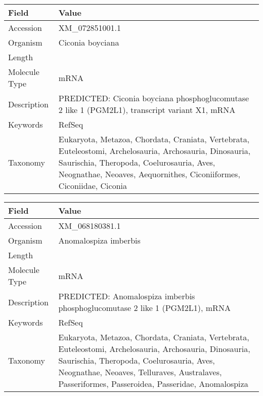 \documentclass[10pt]{article}
\begin{document}
\vspace{1em}
{\footnotesize
\begin{longtable}{>{\raggedright\arraybackslash}p{4.5cm} >{\raggedright\arraybackslash}p{11.5cm}}
\textbf{Field} & \textbf{Value} \\
\hline
Accession & XM\_072851001.1 \\
Organism & Ciconia boyciana \\
Length & 6462 \\
Molecule Type & mRNA \\
Description & PREDICTED: Ciconia boyciana phosphoglucomutase 2 like 1 (PGM2L1), transcript variant X1, mRNA \\
Keywords & RefSeq \\
Taxonomy & Eukaryota, Metazoa, Chordata, Craniata, Vertebrata, Euteleostomi, Archelosauria, Archosauria, Dinosauria, Saurischia, Theropoda, Coelurosauria, Aves, Neognathae, Neoaves, Aequornithes, Ciconiiformes, Ciconiidae, Ciconia \\
\end{longtable}
}

\vspace{1em}
{\footnotesize
\begin{longtable}{>{\raggedright\arraybackslash}p{4.5cm} >{\raggedright\arraybackslash}p{11.5cm}}
\textbf{Field} & \textbf{Value} \\
\hline
Accession & XM\_068180381.1 \\
Organism & Anomalospiza imberbis \\
Length & 5509 \\
Molecule Type & mRNA \\
Description & PREDICTED: Anomalospiza imberbis phosphoglucomutase 2 like 1 (PGM2L1), mRNA \\
Keywords & RefSeq \\
Taxonomy & Eukaryota, Metazoa, Chordata, Craniata, Vertebrata, Euteleostomi, Archelosauria, Archosauria, Dinosauria, Saurischia, Theropoda, Coelurosauria, Aves, Neognathae, Neoaves, Telluraves, Australaves, Passeriformes, Passeroidea, Passeridae, Anomalospiza \\
\end{longtable}
}
\end{document}
